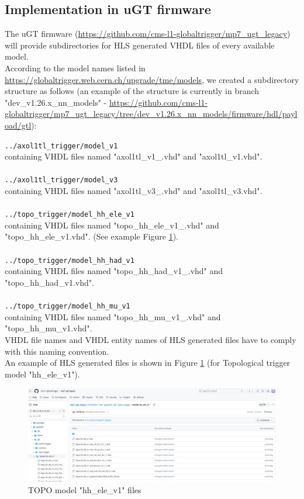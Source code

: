 \subsection{Implementation in uGT firmware}

The uGT firmware (\url{https://github.com/cms-l1-globaltrigger/mp7_ugt_legacy}) will provide subdirectories for HLS generated VHDL files of every available model.\\
According to the model names listed in \url{https://globaltrigger.web.cern.ch/upgrade/tme/models}, we created a subdirectory structure as follows (an example of the structure is currently in branch "dev\_v1.26.x\_nn\_models" - \url{https://github.com/cms-l1-globaltrigger/mp7_ugt_legacy/tree/dev_v1.26.x_nn_models/firmware/hdl/payload/gtl}):

\texttt{../axol1tl\_trigger/model\_v1}\\
containing VHDL files named "axol1tl\_v1\_<hls file name>.vhd" and "axol1tl\_v1.vhd".\\\\
\texttt{../axol1tl\_trigger/model\_v3}\\
containing VHDL files named "axol1tl\_v3\_<hls file name>.vhd" and "axol1tl\_v3.vhd".\\\\
\texttt{../topo\_trigger/model\_hh\_ele\_v1}\\
containing VHDL files named "topo\_hh\_ele\_v1\_<hls file name>.vhd" and "topo\_hh\_ele\_v1.vhd". (See example Figure \ref{fig:hh_ele_v1_files}).\\\\
\texttt{../topo\_trigger/model\_hh\_had\_v1}\\
containing VHDL files named "topo\_hh\_had\_v1\_<hls file name>.vhd" and "topo\_hh\_had\_v1.vhd".\\\\
\texttt{../topo\_trigger/model\_hh\_mu\_v1}\\
containing VHDL files named "topo\_hh\_mu\_v1\_<hls file name>.vhd" and "topo\_hh\_mu\_v1.vhd".\\

VHDL file names and VHDL entity names of HLS generated files have to comply with this naming convention.\\
An example of HLS generated files is shown in Figure \ref{fig:hh_ele_v1_files} (for Topological trigger model "hh\_ele\_v1").

\begin{figure}[htb]
\centering
\includegraphics[width=15cm]{figures/hh_ele_v1_files}
\caption{TOPO model "hh\_ele\_v1" files}
\label{fig:hh_ele_v1_files}
\end{figure}

